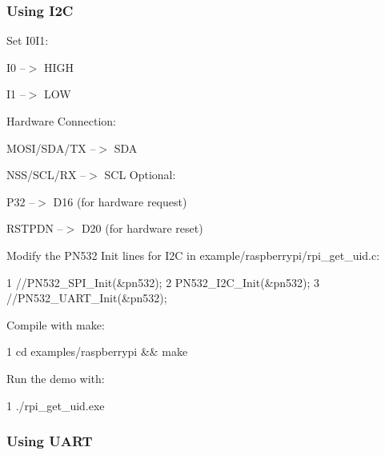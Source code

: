 \subsubsection*{Using I2\+C}


\begin{DoxyEnumerate}
\item Set I0\+I1\+:
\end{DoxyEnumerate}
\begin{DoxyItemize}
\item I0 --$>$ H\+I\+G\+H
\item I1 --$>$ L\+O\+W
\end{DoxyItemize}
\begin{DoxyEnumerate}
\item Hardware Connection\+:
\end{DoxyEnumerate}
\begin{DoxyItemize}
\item M\+O\+S\+I/\+S\+D\+A/\+T\+X --$>$ S\+D\+A
\item N\+S\+S/\+S\+C\+L/\+R\+X --$>$ S\+C\+L Optional\+:
\item P32 --$>$ D16 (for hardware request)
\item R\+S\+T\+P\+D\+N --$>$ D20 (for hardware reset)
\end{DoxyItemize}
\begin{DoxyEnumerate}
\item Modify the P\+N532 Init lines for I2\+C in {\ttfamily example/raspberrypi/rpi\+\_\+get\+\_\+uid.\+c}\+: 
\begin{DoxyCode}
1 //PN532\_SPI\_Init(&pn532);
2 PN532\_I2C\_Init(&pn532);
3 //PN532\_UART\_Init(&pn532);
\end{DoxyCode}

\item Compile with make\+: 
\begin{DoxyCode}
1 cd examples/raspberrypi && make
\end{DoxyCode}

\item Run the demo with\+: 
\begin{DoxyCode}
1 ./rpi\_get\_uid.exe
\end{DoxyCode}

\end{DoxyEnumerate}

\subsubsection*{Using U\+A\+R\+T}


